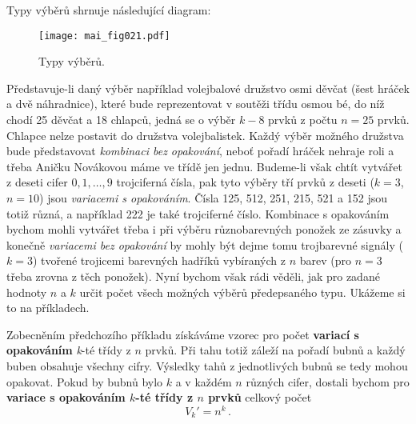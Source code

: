       Typy výběrů shrnuje následující diagram:
      \begin{figure}[ht!] %
        \centering
        \texttt{[image: mai\_fig021.pdf]}
        \caption{Typy výběrů. \cite[s.~201]{Musilova2009MA1}}
        \label{mai_fig021}
      \end{figure}

      Představuje-li daný výběr například volejbalové družstvo osmi děvčat (šest hráček a dvě 
      náhradnice), které bude reprezentovat v soutěži třídu osmou bé, do níž chodí \num{25} děvčat 
      a \num{18} chlapců, jedná se o výběr \(k - 8\) prvků z počtu \(n = 25\) prvků. Chlapce nelze 
      postavit do družstva volejbalistek. Každý výběr možného družstva bude představovat 
      \emph{kombinaci bez opakování}, neboť pořadí hráček nehraje roli a třeba Aničku Novákovou 
      máme ve třídě jen jednu. Budeme-li však chtít vytvářet z deseti cifer \(0, 1, \ldots, 9\) 
      trojciferná čísla, pak tyto výběry tří prvků z deseti (\(k = 3\), \(n = 10\)) jsou 
      \emph{variacemi s opakováním}. Čísla \num{125}, \num{512}, \num{251}, \num{215}, \num{521} a 
      \num{152} jsou totiž různá, a například \num{222} je také trojciferné číslo. Kombinace s 
      opakováním bychom mohli vytvářet třeba i při výběru různobarevných ponožek ze zásuvky a 
      konečně \emph{variacemi bez opakování} by mohly být dejme tomu trojbarevné signály (\(k = 
      3\)) tvořené trojicemi barevných hadříků vybíraných z \(n\) barev (pro \(n = 3\) třeba zrovna 
      z těch ponožek). Nyní bychom však rádi věděli, jak pro zadané hodnoty \(n\) a \(k\) určit 
      počet všech možných výběrů předepsaného typu. Ukážeme si to na příkladech.

      
      
      Zobecněním předchozího příkladu získáváme vzorec pro počet \textbf{variací s opakováním} 
      \emph{k}-té třídy z \(n\) prvků. Při tahu totiž záleží na pořadí bubnů a každý buben obsahuje 
      všechny cifry. Výsledky tahů z jednotlivých bubnů se tedy mohou opakovat. Pokud by bubnů bylo 
      \(k\) a v každém \(n\) různých cifer, dostali bychom pro \textbf{variace s opakováním 
      \(k\)-té třídy z \(n\) prvků} celkový počet
      \begin{equation}\label{mai:eq007}
        \boxed{V_k' = n^k}\, .
      \end{equation}

